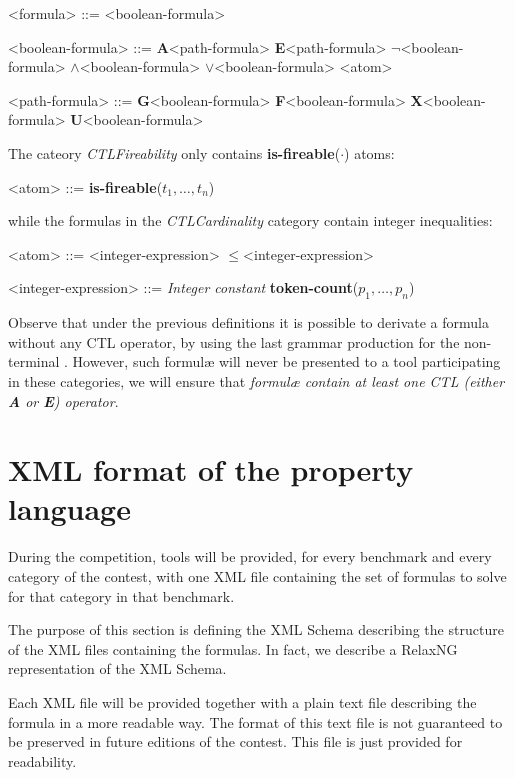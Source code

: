 \documentclass[10pt,english,a4paper]{article}
\newcommand\ctla             {\textbf{A}\xspace}
\newcommand\ctle             {\textbf{E}\xspace}
\newcommand\ltlf             {\textbf{F}\xspace}
\newcommand\ltlg             {\textbf{G}\xspace}
\newcommand\ltlx             {\textbf{X}\xspace}
\newcommand\ltlu             {\textbf{U}\xspace}
\newcommand\logicnot         {\boldmath$\lnot$\xspace}
\newcommand\logicand         {\boldmath$\land$\xspace}
\newcommand\logicor          {\boldmath$\lor$\xspace}
\newcommand\atomleq          {\boldmath$\leq$\xspace}
\newcommand\atomisfire[1]    {\textbf{is-fireable}(#1)}
\newcommand\atomtokenscnt[1] {\textbf{token-count}(#1)}
\begin{document}
\begin{grammar}
<formula> ::= <boolean-formula>

<boolean-formula> ::=
     \ctla <path-formula>
\alt \ctle <path-formula>
\alt \logicnot <boolean-formula>
 \logicand <boolean-formula>
 \logicor <boolean-formula>
\alt <atom>

<path-formula> ::=
     \ltlg <boolean-formula>
\alt \ltlf <boolean-formula>
\alt \ltlx <boolean-formula>
 \ltlu <boolean-formula>
\end{grammar}

The cateory \emph{CTLFireability} only contains \atomisfire{$\cdot$} atoms:

\begin{grammar}
<atom> ::= \atomisfire{$t_1, \ldots, t_n$}
\end{grammar}

while the formulas in the \emph{CTLCardinality} category contain
integer inequalities:

\begin{grammar}
<atom> ::= <integer-expression> \atomleq <integer-expression>

<integer-expression> ::= \textit{Integer constant}
\alt \atomtokenscnt{$p_1, \ldots, p_n$}
\end{grammar}

Observe that under the previous definitions it is possible to derivate a
formula without any CTL operator, by using the last grammar production for
the non-terminal .
However, such formul{\ae} will never be presented to a tool participating
in these categories, we will ensure that
\emph{formul{\ae} contain at least one CTL (either \ctla or \ctle)
operator}.

\section{XML format of the property language}
\label{s:rng}

During the competition, tools will be provided, for every benchmark and
every category of the contest, with one XML file containing the set of
formulas to solve for that category in that benchmark.

The purpose of this section is defining the XML Schema describing the
structure of the XML files containing the formulas.
In fact, we describe a RelaxNG representation of the XML Schema.

Each XML file will be provided together with a plain text file describing
the formula in a more readable way.
The format of this text file is not guaranteed to be preserved in future
editions of the contest. This file is just provided for readability.
\end{document}
